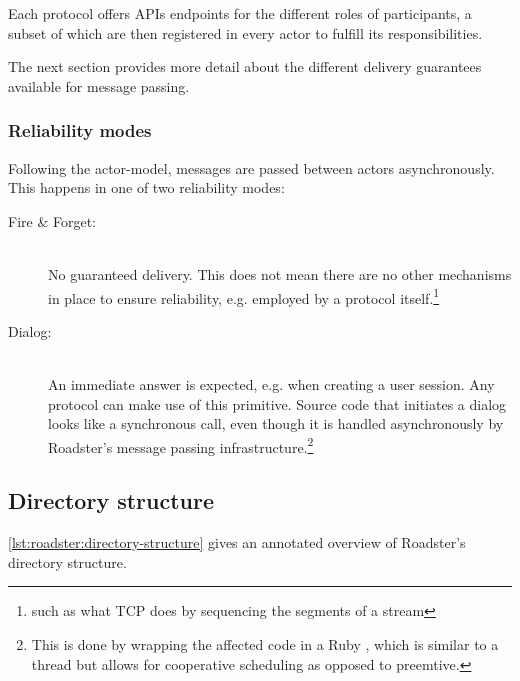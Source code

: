 Each protocol offers \glspl{API} endpoints for the different roles of
participants, a subset of which are then registered in every actor to fulfill
its responsibilities.

The next section provides more detail about the different
delivery guarantees available for message passing.

\subsubsection{Reliability modes}
Following the \gls{actor-model}, messages are passed between actors
asynchronously. This happens in one of two reliability modes:

\begin{description}
\item [Fire \& Forget:]\hfill\\
No guaranteed delivery. This does not mean there are no other mechanisms in
place to ensure reliability, e.g. employed by a protocol itself.\footnote{such
as what \gls{TCP} does by sequencing the segments of a stream}

\item [Dialog:]\hfill\\
An immediate answer is expected, e.g. when creating a user
session. Any protocol can make use of this primitive. Source code that
initiates a dialog looks like a synchronous call, even though
it is handled asynchronously by Roadster's message passing
infrastructure.\footnote{This is done by wrapping the affected
code in a Ruby , which is similar to a thread but
allows for cooperative scheduling as opposed to preemtive.}
\end{description}


\subsection{Directory structure}
\autoref{lst:roadster:directory-structure} gives an annotated overview of Roadster's directory structure.


